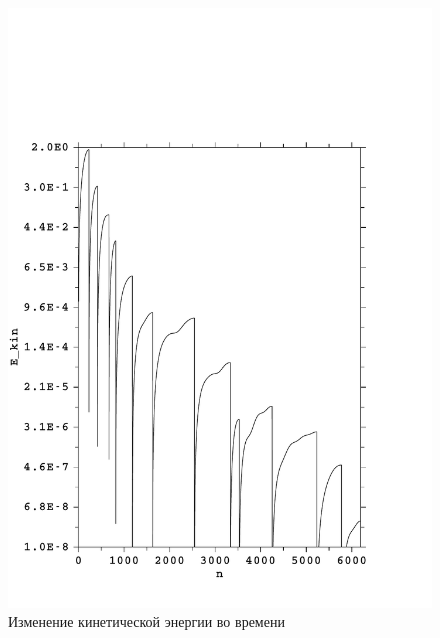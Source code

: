 \begin{figure}[h!]
\centering
  \includegraphics[width=1.0\textwidth]{./FIGs/Kin_energy_MD.pdf}
\caption{Изменение кинетической энергии во времени}
\label{kinet_energy_MD}
\end{figure}

